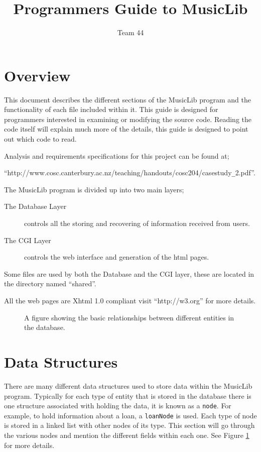 \documentclass{article}
\title{Programmers Guide to MusicLib}
\author{Team 44}
\begin{document}
\maketitle
\newpage
\tableofcontents
\newpage
\section{Overview}
This document describes the different sections of the MusicLib program and the functionality of each file included within it. This guide is designed for programmers interested in examining or modifying the source code. Reading the code itself will explain much more of the details, this guide is designed to point out which code to read.

Analysis and requirements specifications for this project can be found at;

``http://www.cosc.canterbury.ac.nz/teaching/handouts/cosc204/casestudy\verb|_|2.pdf''.


The MusicLib program is divided up into two main layers;
\begin{description} 
\item[The Database Layer] controls all the storing and recovering of information received from users.
\item[The CGI Layer] controls the web interface and generation of the html pages.
\end{description}

Some files are used by both the Database and the CGI layer, these are located in the directory named ``shared''.

All the web pages are Xhtml 1.0 compliant visit ``http://w3.org'' for more details.
\begin{figure}
\begin{center}
\caption{A figure showing the basic relationships between different entities in the database.}
\label{Fig1}
\end{center}
\end{figure}
\section{Data Structures}
There are many different data structures used to store data within the MusicLib program. Typically for each type of entity that is stored in the database there is one structure associated with holding the data, it is known as a \verb|node|. For example, to hold information about a loan, a \verb|loanNode| is used.
Each type of node is stored in a linked list with other nodes of its type. This section will go through the various nodes and mention the different fields within each one. See Figure \ref{Fig1} for more details.
\end{document}
